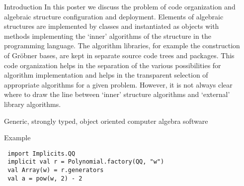 \documentclass[final]{beamer}
\begin{document}
\begin{frame}[fragile]
\begin{columns}[t]
\begin{column}{.3\linewidth}
\begin{block}{\large Introduction}
In this poster we discuss the problem of code organization and
algebraic structure configuration and deployment. Elements of algebraic
structures are implemented by classes and instantiated as objects with
methods implementing the `inner' algorithms of the structure in the
programming language. The algorithm libraries, for example the
construction of Gr\"obner bases, are kept in separate source code trees
and packages. This code organization helps in the separation of the
various possibilities for algorithm implementation and helps in the
transparent selection of appropriate algorithms for a given problem.
However, it is not always clear where to draw the line between `inner'
structure algorithms and `external' library algorithms.
  \end{block}
  \hfill
  \begin{block}{\large Generic, strongly typed, object oriented computer algebra software}
      \centering
  \end{block}
  \hfill
  \begin{block}{\large Example}
\tiny 
\begin{lstlisting} 
 import Implicits.QQ
 implicit val r = Polynomial.factory(QQ, "w")
 val Array(w) = r.generators
 val a = pow(w, 2) - 2 
\end{lstlisting} 
%
%
  \end{block}
\end{column}


\begin{column}{.3\linewidth}
 

\end{column}
\end{columns}
\end{frame}
\end{document}
